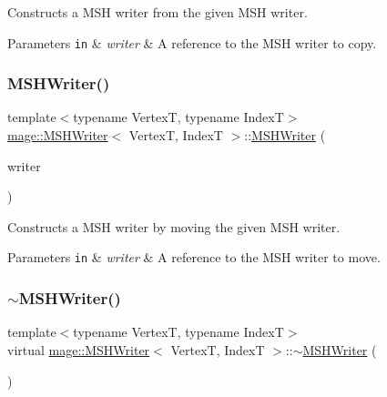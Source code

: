 Constructs a M\+SH writer from the given M\+SH writer.


\begin{DoxyParams}[1]{Parameters}
\mbox{\tt in}  & {\em writer} & A reference to the M\+SH writer to copy. \\
\hline
\end{DoxyParams}
\hypertarget{classmage_1_1_m_s_h_writer_a69988e7b0eea3b4e9053455955acaec5}{}\label{classmage_1_1_m_s_h_writer_a69988e7b0eea3b4e9053455955acaec5} 
\subsubsection{\texorpdfstring{M\+S\+H\+Writer()}{MSHWriter()}\hspace{0.1cm}{\footnotesize\ttfamily [3/3]}}
{\footnotesize\ttfamily template$<$typename VertexT, typename IndexT$>$ \\
\hyperlink{classmage_1_1_m_s_h_writer}{mage\+::\+M\+S\+H\+Writer}$<$ VertexT, IndexT $>$\+::\hyperlink{classmage_1_1_m_s_h_writer}{M\+S\+H\+Writer} (\begin{DoxyParamCaption}\item[{\hyperlink{classmage_1_1_m_s_h_writer}{M\+S\+H\+Writer}$<$ VertexT, IndexT $>$ \&\&}]{writer }\end{DoxyParamCaption})}

Constructs a M\+SH writer by moving the given M\+SH writer.


\begin{DoxyParams}[1]{Parameters}
\mbox{\tt in}  & {\em writer} & A reference to the M\+SH writer to move. \\
\hline
\end{DoxyParams}
\hypertarget{classmage_1_1_m_s_h_writer_a75e57bab20c8928b230305118bf9aa5f}{}\label{classmage_1_1_m_s_h_writer_a75e57bab20c8928b230305118bf9aa5f} 
\subsubsection{\texorpdfstring{$\sim$\+M\+S\+H\+Writer()}{~MSHWriter()}}
{\footnotesize\ttfamily template$<$typename VertexT, typename IndexT$>$ \\
virtual \hyperlink{classmage_1_1_m_s_h_writer}{mage\+::\+M\+S\+H\+Writer}$<$ VertexT, IndexT $>$\+::$\sim$\hyperlink{classmage_1_1_m_s_h_writer}{M\+S\+H\+Writer} (\begin{DoxyParamCaption}{ }\end{DoxyParamCaption})\hspace{0.3cm}{\ttfamily [virtual]}}

